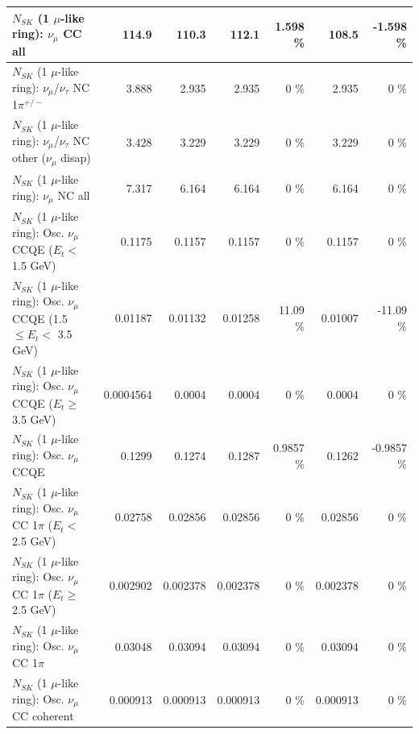 \begin{table}
\begin{tabular}{| l | r | r | r  r | r  r |}
                                $N_{SK}$ (1 $\mu$-like ring): $\nu_{\mu}$ CC all &           114.9 &           110.3 &           112.1 &    1.598 \%  &           108.5 &   -1.598 \%  \\ 
\hline
              $N_{SK}$ (1 $\mu$-like ring): $\nu_\mu$/$\nu_\tau$ NC 1$\pi^{+/-}$ &           3.888 &           2.935 &           2.935 &        0 \%  &           2.935 &        0 \%  \\ 
   $N_{SK}$ (1 $\mu$-like ring): $\nu_\mu$/$\nu_\tau$ NC other ($\nu_\mu$ disap) &           3.428 &           3.229 &           3.229 &        0 \%  &           3.229 &        0 \%  \\ 
                                $N_{SK}$ (1 $\mu$-like ring): $\nu_{\mu}$ NC all &           7.317 &           6.164 &           6.164 &        0 \%  &           6.164 &        0 \%  \\ 
\hline
\hline
           $N_{SK}$ (1 $\mu$-like ring): Osc. $\nu_\mu$ CCQE ($E_{t} <$ 1.5 GeV) &          0.1175 &          0.1157 &          0.1157 &        0 \%  &          0.1157 &        0 \%  \\ 
  $N_{SK}$ (1 $\mu$-like ring): Osc. $\nu_\mu$ CCQE (1.5 $\leq E_{t} <$ 3.5 GeV) &         0.01187 &         0.01132 &         0.01258 &    11.09 \%  &         0.01007 &   -11.09 \%  \\ 
        $N_{SK}$ (1 $\mu$-like ring): Osc. $\nu_\mu$ CCQE ($E_{t} \geq$ 3.5 GeV) &       0.0004564 &          0.0004 &          0.0004 &        0 \%  &          0.0004 &        0 \%  \\ 
\hline
                               $N_{SK}$ (1 $\mu$-like ring): Osc. $\nu_\mu$ CCQE &          0.1299 &          0.1274 &          0.1287 &   0.9857 \%  &          0.1262 &  -0.9857 \%  \\ 
\hline
      $N_{SK}$ (1 $\mu$-like ring): Osc. $\nu_\mu$ CC 1$\pi$ ($E_{t} <$ 2.5 GeV) &         0.02758 &         0.02856 &         0.02856 &        0 \%  &         0.02856 &        0 \%  \\ 
   $N_{SK}$ (1 $\mu$-like ring): Osc. $\nu_\mu$ CC 1$\pi$ ($E_{t} \geq$ 2.5 GeV) &        0.002902 &        0.002378 &        0.002378 &        0 \%  &        0.002378 &        0 \%  \\ 
\hline
                          $N_{SK}$ (1 $\mu$-like ring): Osc. $\nu_\mu$ CC 1$\pi$ &         0.03048 &         0.03094 &         0.03094 &        0 \%  &         0.03094 &        0 \%  \\ 
                        $N_{SK}$ (1 $\mu$-like ring): Osc. $\nu_\mu$ CC coherent &        0.000913 &        0.000913 &        0.000913 &        0 \%  &        0.000913 &        0 \%  \\ 

\end{tabular}
\end{table}
